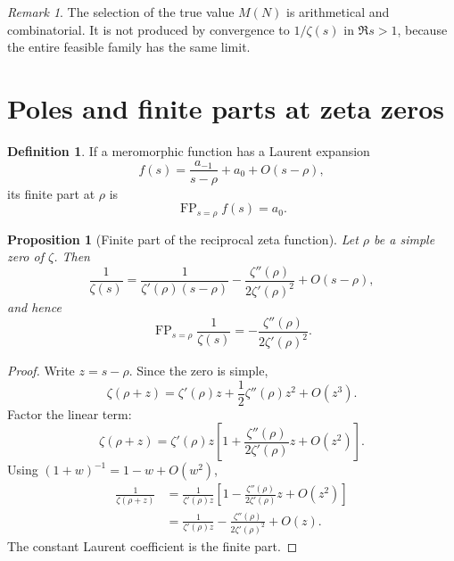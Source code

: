 \documentclass[11pt]{amsart}
\numberwithin{equation}{section}
\theoremstyle{plain}
\newtheorem{proposition}[theorem]{Proposition}
\theoremstyle{definition}
\newtheorem{definition}[theorem]{Definition}
\theoremstyle{remark}
\newtheorem{remark}[theorem]{Remark}
\DeclareMathOperator{\FP}{FP}
\newcommand{\1}{\mathbf{1}}
\begin{document}
\begin{remark}
\label{rem:arithmetic_not_complex_selection}
The selection of the true value \(M(N)\) is arithmetical and
combinatorial.  It is not produced by convergence to \(1/\zeta(s)\) in
\(\Re s>1\), because the entire feasible family has the same limit.
\end{remark}

\section{Poles and finite parts at zeta zeros}
\label{sec:finite_parts}

\begin{definition}
\label{def:finite_part}
If a meromorphic function has a Laurent expansion
\begin{equation}
f(s)
=
\frac{a_{-1}}{s-\rho}+a_0+O(s-\rho),
\label{eq:finite_part_laurent}
\end{equation}
its finite part at \(\rho\) is
\begin{equation}
\FP_{s=\rho}f(s)=a_0.
\label{eq:finite_part_definition}
\end{equation}
\end{definition}

\begin{proposition}[Finite part of the reciprocal zeta function]
\label{prop:finite_part_inverse_zeta}
Let \(\rho\) be a simple zero of \(\zeta\).  Then
\begin{equation}
\frac1{\zeta(s)}
=
\frac{1}{\zeta'(\rho)(s-\rho)}
-
\frac{\zeta''(\rho)}{2\zeta'(\rho)^2}
+
O(s-\rho),
\label{eq:inverse_zeta_laurent}
\end{equation}
and hence
\begin{equation}
\FP_{s=\rho}\frac1{\zeta(s)}
=
-\frac{\zeta''(\rho)}{2\zeta'(\rho)^2}.
\label{eq:inverse_zeta_finite_part}
\end{equation}
\end{proposition}

\begin{proof}
Write \(z=s-\rho\).  Since the zero is simple,
\begin{equation}
\zeta(\rho+z)
=
\zeta'(\rho)z
+
\frac12\zeta''(\rho)z^2
+
O(z^3).
\label{eq:inverse_zeta_taylor_detailed}
\end{equation}
Factor the linear term:
\begin{equation}
\zeta(\rho+z)
=
\zeta'(\rho)z
\left[
1+
\frac{\zeta''(\rho)}{2\zeta'(\rho)}z
+O(z^2)
\right].
\label{eq:inverse_zeta_factor_detailed}
\end{equation}
Using \((1+w)^{-1}=1-w+O(w^2)\),
\begin{align}
\frac1{\zeta(\rho+z)}
&=
\frac1{\zeta'(\rho)z}
\left[
1-
\frac{\zeta''(\rho)}{2\zeta'(\rho)}z
+O(z^2)
\right]
\label{eq:inverse_zeta_invert_detailed}
\\
&=
\frac1{\zeta'(\rho)z}
-
\frac{\zeta''(\rho)}{2\zeta'(\rho)^2}
+O(z).
\label{eq:inverse_zeta_laurent_detailed}
\end{align}
The constant Laurent coefficient is the finite part.
\end{proof}
\end{document}
